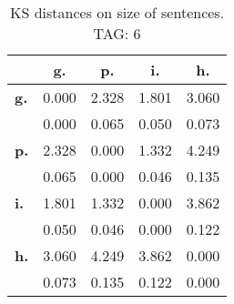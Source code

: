 \begin{table}[h!]
\begin{center}
\begin{tabular}{| l || c | c | c | c |}\hline
 & {\bf g.} & {\bf p.} & {\bf i.} & {\bf h.} \\\hline\hline
{\bf g.} & 0.000 & 2.328 & 1.801 & 3.060 \\
{\bf } & 0.000 & 0.065 & 0.050 & 0.073 \\\hline
{\bf p.} & 2.328 & 0.000 & 1.332 & 4.249 \\
{\bf } & 0.065 & 0.000 & 0.046 & 0.135 \\\hline
{\bf i.} & 1.801 & 1.332 & 0.000 & 3.862 \\
{\bf } & 0.050 & 0.046 & 0.000 & 0.122 \\\hline
{\bf h.} & 3.060 & 4.249 & 3.862 & 0.000 \\
{\bf } & 0.073 & 0.135 & 0.122 & 0.000 \\\hline
\end{tabular}
\caption{KS distances on size of sentences. TAG: 6}
\end{center}
\end{table}